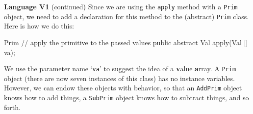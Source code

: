 \begin{minipage}[t]{\sw}
\slidenumber
\LARGE
{\bf Language V1} (continued)\exx
Since we are using the \verb'apply' method with a \verb'Prim' object,
we need to add a declaration for this method
to the (abstract) \verb'Prim' class.
Here is how we do this:
{\Large
\begin{qv}
Prim
    // apply the primitive to the passed values
    public abstract Val apply(Val [] va);
\end{qv}
}
We use the parameter name `\verb'va''
to suggest the idea of a {\bf v}alue {\bf a}rray.\exx
A \verb'Prim' object (there are now seven instances of this class)
has no instance variables.
However, we can endow these objects with behavior,
so that an \verb'AddPrim' object knows how to add things,
a \verb'SubPrim' object knows how to subtract things,
and so forth.\exx
\end{minipage}
\clearpage
